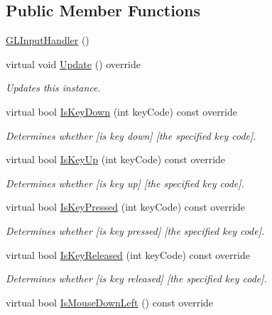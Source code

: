 \subsection*{Public Member Functions}
\begin{DoxyCompactItemize}
\item 
\hyperlink{class_g_l_input_handler_ac6d385f8650ba36063e61c36d8fda95e}{G\+L\+Input\+Handler} ()
\item 
virtual void \hyperlink{class_g_l_input_handler_ab0d7e33520356b9de4298e941c3155f6}{Update} () override
\begin{DoxyCompactList}\small\item\em Updates this instance. \end{DoxyCompactList}\item 
virtual bool \hyperlink{class_g_l_input_handler_ad6598623bbf7506111da24fd2bc6b9fe}{Is\+Key\+Down} (int key\+Code) const  override
\begin{DoxyCompactList}\small\item\em Determines whether \mbox{[}is key down\mbox{]} \mbox{[}the specified key code\mbox{]}. \end{DoxyCompactList}\item 
virtual bool \hyperlink{class_g_l_input_handler_a3a1dbf9463118c74302228e02dfb0cbf}{Is\+Key\+Up} (int key\+Code) const  override
\begin{DoxyCompactList}\small\item\em Determines whether \mbox{[}is key up\mbox{]} \mbox{[}the specified key code\mbox{]}. \end{DoxyCompactList}\item 
virtual bool \hyperlink{class_g_l_input_handler_a650016eee7bab73d55898617e7cd9bfd}{Is\+Key\+Pressed} (int key\+Code) const  override
\begin{DoxyCompactList}\small\item\em Determines whether \mbox{[}is key pressed\mbox{]} \mbox{[}the specified key code\mbox{]}. \end{DoxyCompactList}\item 
virtual bool \hyperlink{class_g_l_input_handler_adddafba34c7070325782cbf55673730a}{Is\+Key\+Released} (int key\+Code) const  override
\begin{DoxyCompactList}\small\item\em Determines whether \mbox{[}is key released\mbox{]} \mbox{[}the specified key code\mbox{]}. \end{DoxyCompactList}\item 
virtual bool \hyperlink{class_g_l_input_handler_a48e56569f72e08c9278767f51e6db83b}{Is\+Mouse\+Down\+Left} () const  override

\end{DoxyCompactItemize}
